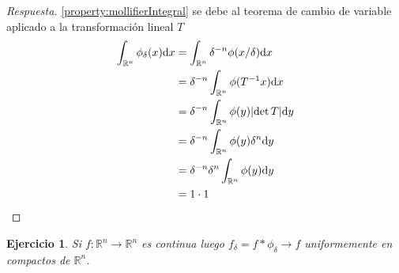 \documentclass{article}
\newcommand{\realNumbers}{\mathbb{R}}
\newtheorem{exercise}{Ejercicio}
\theoremstyle{remark}
\begin{document}
\begin{proof}[Respuesta]
  \ref{property:mollifierIntegral}
  se debe al teorema de cambio de variable aplicado a la transformación lineal \(T\)
  \begin{align}
    \int_{\realNumbers^n} \phi_{\delta}(x) \dd x
    &=
    \int_{\realNumbers^n} \delta^{- n} \phi(x / \delta) \dd x
    \\
    &=
    \delta^{- n}
    \int_{\realNumbers^n}\phi(T^{- 1} x) \dd x
    \\
    &=
    \delta^{- n}
    \int_{\realNumbers^n}\phi(y) \abs{\det T} \dd y
    \\
    &=
    \delta^{- n}
    \int_{\realNumbers^n}\phi(y) \delta^n \dd y
    \\
    &=
    \delta^{- n} \delta^n 
    \int_{\realNumbers^n}\phi(y) \dd y
    \\
    &=
    1 
    \cdot 1
  \end{align}
\end{proof}

\begin{exercise}
  Si \(f : \realNumbers^n \rightarrow \realNumbers^n\) es continua luego \(f_{\delta} = f * \phi_{\delta} \rightarrow f\) uniformemente en compactos de \(\realNumbers^n\).
\end{exercise}
\end{document}

